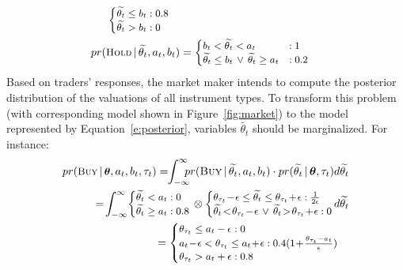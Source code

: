 \documentclass[letterpaper]{article}
\begin{document}
{\begin{align*}
{\footnotesize
\begin{cases}
\widetilde{\theta_{t}} \leq b_{t} 		: 0.8\\
\widetilde{\theta_{t}} > b_{t} 		: 0
\end{cases}
}
\\
{\footnotesize pr (\textsc{Hold} \, | \, \widetilde{\theta_{t}}, a_{t}, b_{t})} &=
{\footnotesize
\begin{cases}
b_{t} < \widetilde{\theta_{t}} < 
a_{t} 								 & : 1\\
\widetilde{\theta_{t}} \leq b_{t} \, \vee\,  
\widetilde{\theta_{t}} 
\geq a_{t}	 	 & : 0.2
\end{cases}
}
\end{align*}
Based on traders' responses, the market maker intends to compute the posterior distribution of the valuations of all instrument types.
To transform this problem (with corresponding model shown in 
Figure~\ref{fig:market})
to the model represented by Equation~\ref{e:posterior}, variables 
$\widetilde{\theta_{t}}$ should be marginalized.
For instance:
{\footnotesize
\begin{eqnarray*}
{\footnotesize
pr(\textsc{Buy} \, | \, \boldsymbol\theta, a_{t}, b_{t}, \tau_t) 
}
=\!\! 
\int_{-\infty}^{\infty} \!\!\!\!pr(\textsc{Buy} \, | \, 
\widetilde{\theta_t}, a_{t}, b_{t})
\cdot pr (\widetilde{\theta_t} \, | \, \boldsymbol\theta, \tau_t ) d 
\widetilde{\theta_t} 
\nonumber 
\\
=\! \int_{-\infty}^{\infty}
{\footnotesize
\!
\begin{cases}
\widetilde{\theta_t}  		<     a_{t}  : 0\\
\widetilde{\theta_t}  		\geq a_{t}  : 0.8
\end{cases} 
}
\!\!\!\!\!\otimes
{\footnotesize
\begin{cases}
\theta_{\tau_t} \!-\! \epsilon \leq \widetilde{\theta_t} \leq 
\theta_{\tau_t} \!+\! \epsilon 					: \frac{1}{2 \epsilon} \\
\widetilde{\theta_t} \!<\! \theta_{\tau_t} \!-\! \epsilon 
\, \vee \, \widetilde{\theta_t} \!>\! \theta_{\tau_t} 
\!+\! \epsilon 	: 0  
\end{cases}
}
\!\!\!\!\!
d \widetilde{\theta_t}
\nonumber \\
=
{\footnotesize
\begin{cases}
\theta_{\tau_t} \leq a_{t} - \epsilon: 0\\
a_{t} \!-\! \epsilon < \theta_{\tau_t} \leq a_{t} \!+\! \epsilon: 
0.4(1 \!+\! \frac{\theta_{\tau_t} - a_t}{\epsilon})\\
\theta_{\tau_t} > a_{t} + \epsilon : 0.8
\end{cases}
}
\end{eqnarray*}
}}%
\end{document}
